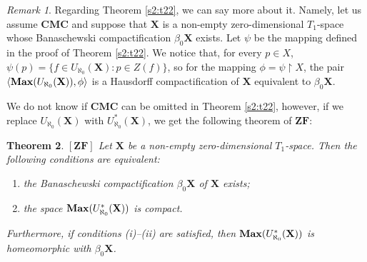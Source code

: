\documentclass[12pt,twoside,leqno]{article}
\theoremstyle{plain}
\newtheorem{theorem}{Theorem}[section]
\theoremstyle{definition}
\theoremstyle{remark}
\newtheorem{remark}[theorem]{Remark}
\DeclareMathOperator{\BMax}{\bf{Max}}
\begin{document}
\begin{remark}
	\label{s2:r23}
	Regarding Theorem \ref{s2:t22}, we can say more about it. Namely, let us assume $\mathbf{CMC}$ and suppose that $\mathbf{X}$ is a non-empty zero-dimensional $T_1$-space whose Banaschewski compactification $\beta_0\mathbf{X}$ exists. Let $\psi$ be the mapping defined in the proof of Theorem \ref{s2:t22}. We notice that, for every $p\in X$, $\psi(p)=\{f\in U_{\aleph_0}(\mathbf{X}): p\in Z(f)\}$, so for the mapping $\phi=\psi\upharpoonright X$, the pair $\langle \BMax(U_{\aleph_0}(\mathbf{X})), \phi\rangle$ is a Hausdorff compactification of $\mathbf{X}$ equivalent to $\beta_0\mathbf{X}$.
\end{remark}

We do not know if $\mathbf{CMC}$ can be omitted in Theorem \ref{s2:t22}, however,  if we replace $U_{\aleph_0}(\mathbf{X})$ with $U_{\aleph_0}^{\ast}(\mathbf{X})$, we get the following theorem of $\mathbf{ZF}$:

\begin{theorem}
	\label{s2:t24}
	$[\mathbf{ZF}]$
	Let $\mathbf{X}$ be a non-empty zero-dimensional $T_1$-space. Then the following conditions are equivalent:
	\begin{enumerate}
		\item[(i)] the Banaschewski compactification $\beta_0\mathbf{X}$ of $\mathbf{X}$ exists;
		\item[(ii)] the space $\BMax(U_{\aleph_0}^{\ast}(\mathbf{X}))$ is compact.
	\end{enumerate}
	Furthermore, if conditions (i)--(ii) are satisfied, then $\BMax(U_{\aleph_0}^{\ast}(\mathbf{X}))$ is homeomorphic with $\beta_0\mathbf{X}$.
\end{theorem}
\end{document}
